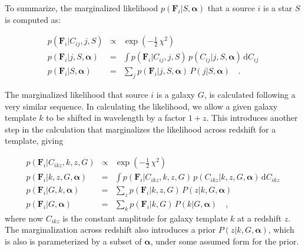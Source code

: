 \documentclass[12pt,preprint]{aastex}
\newcommand{\datavector}[1]{\boldsymbol{#1}}
\newcommand{\flux}{\datavector{F}}
\newcommand{\hyperpars}{\datavector{\alpha}}
\newcommand{\dd}{\mathrm{d}}
\begin{document}
To summarize, the marginalized likelihood $p(\flux_i|S,\hyperpars)$ that 
a source $i$ is a star $S$ is computed as:

\begin{eqnarray}\displaystyle
\label{eqn:starmarg} 
p(\flux_i|C_{ij},j,S) & \propto & \exp(-\frac{1}{2}\,\chi^2)
\nonumber\\
p(\flux_i|j,S,\hyperpars) & = & \int p(\flux_i|C_{ij},j,S)\,p(C_{ij}|j,S,\hyperpars)\,\dd C_{ij}
\nonumber\\
p(\flux_i|S,\hyperpars) & = & \sum_j p(\flux_i|j,S,\hyperpars)\,P(j|S,\hyperpars)
\quad .
\end{eqnarray}


The marginalized likelihood that source $i$ is a galaxy $G$, is calculated 
following a very similar sequence.  In calculating the likelihood, we 
allow a given galaxy template $k$ to be shifted in wavelength by 
a factor $1+z$.  This introduces another step in the calculation that 
marginalizes the likelihood across redshift for a template, giving 

\begin{eqnarray}\displaystyle
\label{eqn:galmarg}
p(\flux_i|C_{ikz},k,z,G) & \propto & \exp(-\frac{1}{2}\,\chi^2)
\nonumber\\
p(\flux_i|k,z,G,\hyperpars) & = & \int p(\flux_i|C_{ikz},k,z,G)\,p(C_{ikz}|k,z,G,
					\hyperpars)\,\dd C_{ikz}
\nonumber\\
p(\flux_i|G,k,\hyperpars) & = & \sum_z p(\flux_i|k,z,G)\,P(z|k,G,\hyperpars)
\nonumber\\
p(\flux_i|G,\hyperpars) & = & \sum_k p(\flux_i|k,G)\,P(k|G,\hyperpars)
\quad ,
\end{eqnarray}
where now $C_{ikz}$ is the constant amplitude for galaxy template $k$
at a redshift $z$.  The marginalization across redshift also introduces 
a prior $P(z|k,G,\hyperpars)$, which is also is parameterized by a subset 
of $\hyperpars$, under some assumed form for the prior.  
\end{document}
